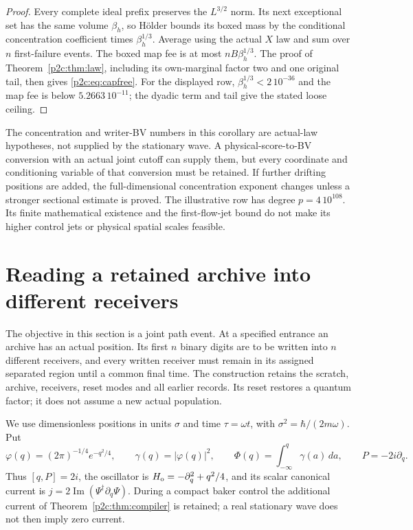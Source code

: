 \documentclass[11pt]{article}
\numberwithin{equation}{section}
\theoremstyle{definition}
\theoremstyle{remark}
\begin{document}
\begin{proof}
Every complete ideal prefix preserves the
$L^{3/2}$ norm. Its next exceptional set has the
same volume $\beta_h$, so H\"older bounds its
boxed mass by the conditional concentration
coefficient times $\beta_h^{1/3}$. Average using
the actual $X$ law and sum over $n$ first-failure
events. The boxed map fee is at most
$nB\beta_h^{1/3}$. The proof of
Theorem~\ref{p2c:thm:law}, including its
own-marginal factor two and one original tail,
then gives \eqref{p2c:eq:capfree}.
For the displayed row,
$\beta_h^{1/3}<2\,10^{-36}$ and the map fee is
below $5.2663\,10^{-11}$; the dyadic term and
tail give the stated loose ceiling.
\end{proof}

The concentration and writer-BV numbers in this
corollary are actual-law hypotheses, not supplied
by the stationary wave. A physical-score-to-BV
conversion with an actual joint cutoff can supply
them, but every coordinate and conditioning
variable of that conversion must be retained.
If further drifting positions are added, the
full-dimensional concentration exponent changes
unless a stronger sectional estimate is proved.
The illustrative row has degree $p=4\,10^{108}$.
Its finite mathematical existence and the
first-flow-jet bound do not make its higher
control jets or physical spatial scales feasible.

\section{Reading a retained archive into different receivers}
\label{p2r:sec:records}

The objective in this section is a joint path event. At a specified
entrance an archive has an actual position. Its first $n$ binary digits
are to be written into $n$ different receivers, and every written
receiver must remain in its assigned separated region until a common
final time. The construction retains the scratch, archive, receivers,
reset modes and all earlier records. Its reset restores a quantum
factor; it does not assume a new actual population.

We use dimensionless positions in units $\sigma$ and time
$\tau=\omega t$, with $\sigma^2=\hbar/(2m\omega)$. Put
\[
 \varphi(q)=(2\pi)^{-1/4}e^{-q^2/4},\qquad
 \gamma(q)=|\varphi(q)|^2,\qquad
 \Phi(q)=\int_{-\infty}^q\gamma(a)\,da,\qquad P=-2i\partial_q.
\]
Thus $[q,P]=2i$, the oscillator is
$H_{\rm o}=-\partial_q^2+q^2/4$, and its scalar canonical current
is $j=2\operatorname{Im}(\Psi^\dagger\partial_q\Psi)$.
During a compact baker control the additional current of
Theorem~\ref{p2c:thm:compiler} is retained; a real stationary wave
does not then imply zero current.
\end{document}
